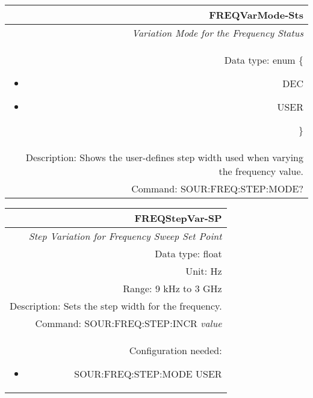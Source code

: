 \documentclass[openany]{article}
\begin{document}
		\begin{tabular}{N}
			\hline
			\bfseries FREQVarMode-Sts \\ \hline
			\emph{Variation Mode for the Frequency Status} \\
			Data type: enum \{\begin{itemize}[noitemsep]
				\small
				\item[] DEC
				\item[] USER
			\end{itemize}\} \\ 
			Description: Shows the user-defines step width used when varying the frequency value. \\
			Command: SOUR:FREQ:STEP:MODE? \\

		\end{tabular}
%
		\begin{tabular}{N}
			\hline
			\bfseries FREQStepVar-SP \\ \hline
			\emph{Step Variation for Frequency Sweep Set Point} \\
			Data type: float \\
			Unit: Hz \\
			Range: 9 kHz to 3 GHz \\
			Description: Sets the step width for the frequency.\\
			Command: SOUR:FREQ:STEP:INCR \emph{value} \\
			Configuration needed: \begin{itemize}[noitemsep]
                                 \small
                                 \item[] SOUR:FREQ:STEP:MODE USER
                         \end{itemize} \\
			
		\end{tabular}
\end{document}
